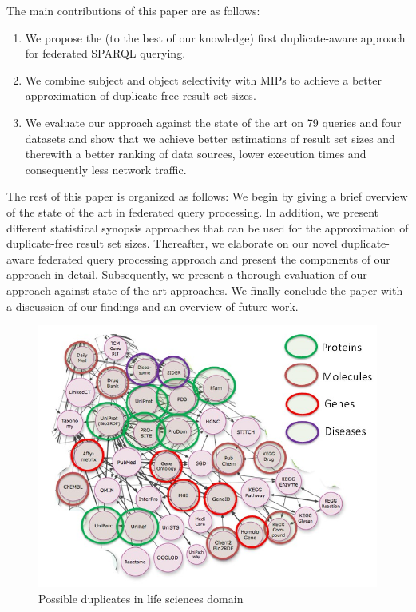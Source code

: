 \documentclass{sig-alternate}  %
\begin{document}
The main contributions of this paper are as follows:
\begin{enumerate}
\item We propose the (to the best of our knowledge) first duplicate-aware approach for federated SPARQL querying.
\item We combine subject and object selectivity with MIPs to achieve a better approximation of duplicate-free result set sizes.
\item We evaluate our approach against the state of the art on 79 queries and four datasets and show that we achieve better estimations of result set sizes and therewith a better ranking of data sources, lower execution times and consequently less network traffic.
\end{enumerate}
%
The rest of this paper is organized as follows: 
We begin by giving a brief overview of the state of the art in federated query processing.
In addition, we present different statistical synopsis approaches that can be used for the approximation of duplicate-free result set sizes. 
Thereafter, we elaborate on our novel duplicate-aware federated query processing approach and present the components of our approach in detail.
Subsequently, we present a thorough evaluation of our approach against state of the art approaches.
We finally conclude the paper with a discussion of our findings and an overview of future work.
\begin{figure}
\centering
\includegraphics[scale=0.70]{img/possibleDuplicates} 
\caption{Possible duplicates in life sciences domain}
\label{fig:datasets}
\end{figure}
\end{document}
